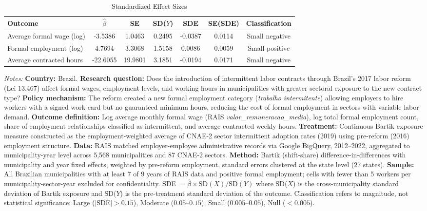 \begin{table}[htbp]
\centering
\caption{Standardized Effect Sizes}
\label{tab:sde}
\begin{adjustbox}{max width=\textwidth}
\begin{tabular}{lcccccc}
\hline\hline
Outcome & $\hat{\beta}$ & SE & SD($Y$) & SDE & SE(SDE) & Classification \\
\hline
Average formal wage (log) & -3.5386 & 1.0463 & 0.2495 & -0.0387 & 0.0114 & Small negative \\
Formal employment (log) & 4.7694 & 3.3068 & 1.5158 & 0.0086 & 0.0059 & Small positive \\
Average contracted hours & -22.6055 & 19.9801 & 3.1851 & -0.0194 & 0.0171 & Small negative \\
\hline\hline
\end{tabular}
\end{adjustbox}
\begin{tablenotes}
\item \textit{Notes:} \textbf{Country:} Brazil. \textbf{Research question:} Does the introduction of intermittent labor contracts through Brazil's 2017 labor reform (Lei 13.467) affect formal wages, employment levels, and working hours in municipalities with greater sectoral exposure to the new contract type? \textbf{Policy mechanism:} The reform created a new formal employment category (\textit{trabalho intermitente}) allowing employers to hire workers with a signed work card but no guaranteed minimum hours, reducing the cost of formal employment in sectors with variable labor demand. \textbf{Outcome definition:} Log average monthly formal wage (RAIS \textit{valor\_remuneracao\_media}), log total formal employment count, share of employment relationships classified as intermittent, and average contracted weekly hours. \textbf{Treatment:} Continuous Bartik exposure measure constructed as the employment-weighted average of CNAE-2 sector intermittent adoption rates (2019) using pre-reform (2016) employment structure. \textbf{Data:} RAIS matched employer-employee administrative records via Google BigQuery, 2012--2022, aggregated to municipality-year level across 5,568 municipalities and 87 CNAE-2 sectors. \textbf{Method:} Bartik (shift-share) difference-in-differences with municipality and year fixed effects, weighted by pre-reform employment, standard errors clustered at the state level (27 states). \textbf{Sample:} All Brazilian municipalities with at least 7 of 9 years of RAIS data and positive formal employment; cells with fewer than 5 workers per municipality-sector-year excluded for confidentiality. SDE $= \hat{\beta} \times \text{SD}(X) / \text{SD}(Y)$ where SD($X$) is the cross-municipality standard deviation of Bartik exposure and SD($Y$) is the pre-treatment standard deviation of the outcome. Classification refers to magnitude, not statistical significance: Large ($|$SDE$| > 0.15$), Moderate ($0.05$--$0.15$), Small ($0.005$--$0.05$), Null ($< 0.005$).
\end{tablenotes}
\end{table}
